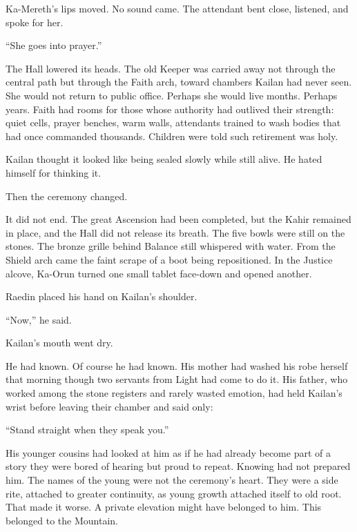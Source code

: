 Ka-Mereth’s lips moved. No sound came. The attendant bent close, listened, and spoke for her.\par

“She goes into prayer.”\par

The Hall lowered its heads. The old Keeper was carried away not through the central path but through the Faith arch, toward chambers Kailan had never seen. She would not return to public office. Perhaps she would live months. Perhaps years. Faith had rooms for those whose authority had outlived their strength: quiet cells, prayer benches, warm walls, attendants trained to wash bodies that had once commanded thousands. Children were told such retirement was holy.\par

Kailan thought it looked like being sealed slowly while still alive. He hated himself for thinking it.\par

Then the ceremony changed.\par

It did not end. The great Ascension had been completed, but the Kahir remained in place, and the Hall did not release its breath. The five bowls were still on the stones. The bronze grille behind Balance still whispered with water. From the Shield arch came the faint scrape of a boot being repositioned. In the Justice alcove, Ka-Orun turned one small tablet face-down and opened another.\par

Raedin placed his hand on Kailan’s shoulder.\par

“Now,” he said.\par

Kailan’s mouth went dry.\par

He had known. Of course he had known. His mother had washed his robe herself that morning though two servants from Light had come to do it. His father, who worked among the stone registers and rarely wasted emotion, had held Kailan’s wrist before leaving their chamber and said only:\par

“Stand straight when they speak you.”\par

His younger cousins had looked at him as if he had already become part of a story they were bored of hearing but proud to repeat. Knowing had not prepared him. The names of the young were not the ceremony’s heart. They were a side rite, attached to greater continuity, as young growth attached itself to old root. That made it worse. A private elevation might have belonged to him. This belonged to the Mountain.\par

